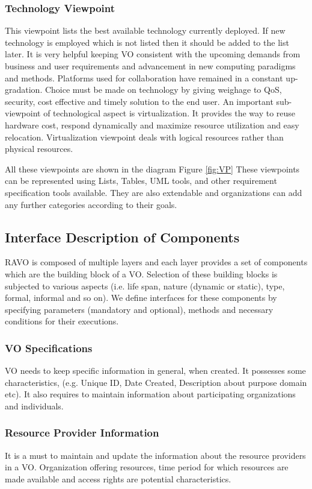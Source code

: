 \documentclass[]{article}
\begin{document}
\subsubsection{Technology Viewpoint}
This viewpoint lists the best available technology currently deployed. If new technology is employed which is not listed then it should be added to the list later. It is very helpful keeping VO consistent with the upcoming demands from business and user requirements and advancement in new computing paradigms and methods. Platforms used for collaboration have remained in a constant up-gradation. Choice must be made on technology by giving weighage to QoS, security, cost effective and timely solution to the end user.
An important sub-viewpoint of technological aspect is virtualization. It provides the way to reuse hardware cost, respond dynamically and maximize resource utilization and easy relocation. Virtualization viewpoint  deals with logical resources rather than physical resources.

All these viewpoints are shown in the diagram Figure \ref{fig:VP}
These viewpoints can be represented using Lists, Tables, UML tools, and other requirement specification tools available. They are also extendable and organizations can add any further categories according to their goals.

\subsection{Interface Description of Components}
RAVO is composed of multiple layers and each layer provides a set of components which are the building block of a VO. Selection of these building blocks is subjected to various aspects (i.e. life span, nature (dynamic or static), type, formal, informal and so on). We define interfaces for these components by specifying parameters (mandatory and optional), methods and necessary conditions for their executions.

\subsubsection{ VO Specifications }
VO needs to keep specific information in general, when created. It possesses some characteristics, (e.g. Unique ID, Date Created, Description about purpose domain etc). It also requires to maintain information about participating organizations and individuals.

\subsubsection{Resource Provider Information}
It is a must to maintain and update the information about the resource providers in a VO. Organization offering resources, time period for which resources are made available and access rights are potential characteristics.
\end{document}
